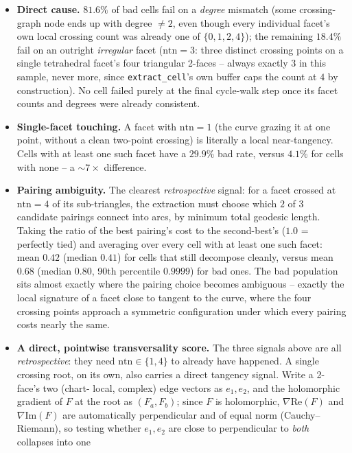\documentclass[11pt]{article}
\begin{document}
\begin{itemize}
\item \textbf{Direct cause.} $81.6\%$ of bad cells fail on a
  \emph{degree} mismatch (some crossing-graph node ends up with degree
  $\ne2$, even though every individual facet's own local crossing count
  was already one of $\{0,1,2,4\}$); the remaining $18.4\%$ fail on an
  outright \emph{irregular} facet ($\mathrm{ntn}=3$: three distinct
  crossing points on a single tetrahedral facet's four triangular
  2-faces -- always exactly $3$ in this sample, never more, since
  \texttt{extract\_cell}'s own buffer caps the count at $4$ by
  construction). No cell failed purely at the final cycle-walk step once
  its facet counts and degrees were already consistent.
\item \textbf{Single-facet touching.} A facet with $\mathrm{ntn}=1$ (the
  curve grazing it at one point, without a clean two-point crossing) is
  literally a local near-tangency. Cells with at least one such facet
  have a $29.9\%$ bad rate, versus $4.1\%$ for cells with none -- a
  $\sim7\times$ difference.
\item \textbf{Pairing ambiguity.} The clearest \emph{retrospective}
  signal: for a facet crossed at $\mathrm{ntn}=4$ of its sub-triangles,
  the extraction must choose which $2$ of $3$ candidate pairings connect
  into arcs, by minimum total geodesic length. Taking the ratio of the
  best pairing's cost to the second-best's ($1.0$ = perfectly tied) and
  averaging over every cell with at least one such facet: mean $0.42$
  (median $0.41$) for cells that still decompose cleanly, versus mean
  $0.68$ (median $0.80$, 90th percentile $0.9999$) for bad ones. The bad
  population sits almost exactly where the pairing choice becomes
  ambiguous -- exactly the local signature of a facet close to tangent
  to the curve, where the four crossing points approach a symmetric
  configuration under which every pairing costs nearly the same.
\item \textbf{A direct, pointwise transversality score.} The three
  signals above are all \emph{retrospective}: they need $\mathrm{ntn}\in
  \{1,4\}$ to already have happened. A single crossing root, on its own,
  also carries a direct tangency signal. Write a 2-face's two (chart-
  local, complex) edge vectors as $e_1,e_2$, and the holomorphic gradient
  of $F$ at the root as $(F_a,F_b)$; since $F$ is holomorphic,
  $\nabla\mathrm{Re}(F)$ and $\nabla\mathrm{Im}(F)$ are automatically
  perpendicular and of equal norm (Cauchy--Riemann), so testing whether
  $e_1,e_2$ are close to perpendicular to \emph{both} collapses into one

\end{itemize}
\end{document}
